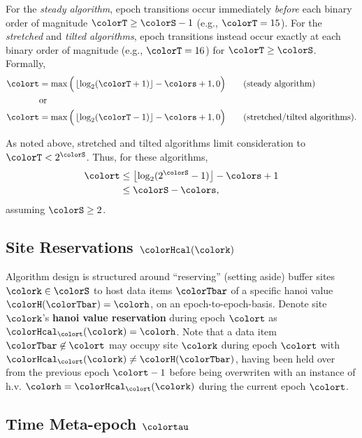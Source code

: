 For the \textit{steady algorithm}, epoch transitions occur immediately \textit{before} each binary order of magnitude $\colorT \geq \colorS - 1$ (e.g.,  $\colorT = 15$).
For the \textit{stretched} and \textit{tilted algorithms}, epoch transitions instead occur exactly at each binary order of magnitude (e.g., $\colorT = 16$) for $\colorT \geq \colorS$.
Formally,
\begin{align*}
\colort &= \max\Big(\left\lfloor \log_2(\colorT+1) \right\rfloor - \colors + 1, 0\Big) \tag{steady algorithm}\\
&\text{or}\\
\colort &= \max\Big(\left\lfloor \log_2(\colorT - 1) \right\rfloor - \colors + 1, 0\Big) \tag{stretched/tilted algorithms}.
\end{align*}

As noted above, stretched and tilted algorithms limit consideration to $\colorT < 2^{\colorS}$.
Thus, for these algorithms,
\begin{align*}
\colort &\leq \left\lfloor\log_2(2^{\colorS} - 1)\right\rfloor - \colors + 1 \\
&\leq \colorS - \colors,
\end{align*}
assuming $\colorS \geq 2$.

\subsection{Site Reservations $\colorHcal(\colork)$}
\label{sec:notation-reservation}

Algorithm design is structured around ``reserving'' (setting aside) buffer sites $\colork \in \colorS$ to host data items $\colorTbar$ of a specific hanoi value $\colorH(\colorTbar) = \colorh$, on an epoch-to-epoch-basis.
Denote site $\colork$'s \textbf{hanoi value reservation} during epoch $\colort$ as $\colorHcal_{\colort}(\colork) = \colorh$.
Note that a data item $\colorTbar \not\in \colort$ may occupy site $\colork$ during epoch $\colort$ with $\colorHcal_{\colort}(\colork) \neq \colorH(\colorTbar)$, having been held over from the previous epoch $\colort - 1$ before being overwriten with an instance of h.v. $\colorh = \colorHcal_{\colort}(\colork)$ during the current epoch $\colort$.

\subsection{Time Meta-epoch $\colortau$}
\label{sec:notation-metaepoch}

